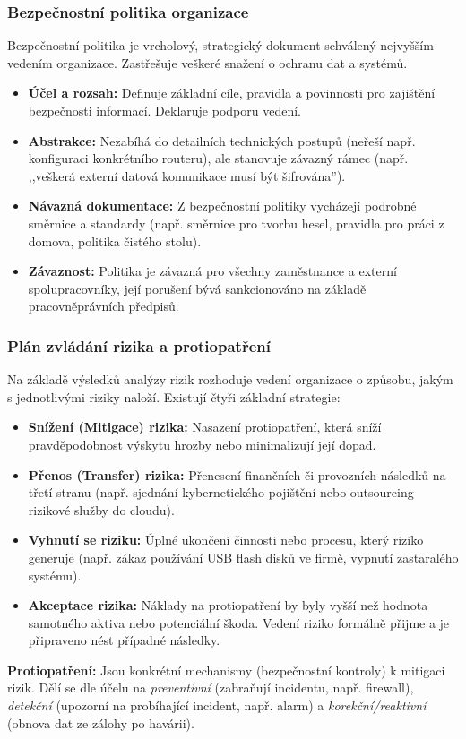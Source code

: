 \subsubsection*{Bezpečnostní politika organizace}
Bezpečnostní politika je vrcholový, strategický dokument schválený nejvyšším vedením organizace. Zastřešuje veškeré snažení o ochranu dat a systémů.
\begin{itemize}
    \item \textbf{Účel a rozsah:} Definuje základní cíle, pravidla a povinnosti pro zajištění bezpečnosti informací. Deklaruje podporu vedení.
    \item \textbf{Abstrakce:} Nezabíhá do detailních technických postupů (neřeší např. konfiguraci konkrétního routeru), ale stanovuje závazný rámec (např. ,,veškerá externí datová komunikace musí být šifrována'').
    \item \textbf{Návazná dokumentace:} Z bezpečnostní politiky vycházejí podrobné směrnice a standardy (např. směrnice pro tvorbu hesel, pravidla pro práci z domova, politika čistého stolu).
    \item \textbf{Závaznost:} Politika je závazná pro všechny zaměstnance a externí spolupracovníky, její porušení bývá sankcionováno na základě pracovněprávních předpisů.
\end{itemize}

\subsubsection*{Plán zvládání rizika a protiopatření}
Na základě výsledků analýzy rizik rozhoduje vedení organizace o způsobu, jakým s jednotlivými riziky naloží. Existují čtyři základní strategie:
\begin{itemize}
    \item \textbf{Snížení (Mitigace) rizika:} Nasazení protiopatření, která sníží pravděpodobnost výskytu hrozby nebo minimalizují její dopad.
    \item \textbf{Přenos (Transfer) rizika:} Přenesení finančních či provozních následků na třetí stranu (např. sjednání kybernetického pojištění nebo outsourcing rizikové služby do cloudu).
    \item \textbf{Vyhnutí se riziku:} Úplné ukončení činnosti nebo procesu, který riziko generuje (např. zákaz používání USB flash disků ve firmě, vypnutí zastaralého systému).
    \item \textbf{Akceptace rizika:} Náklady na protiopatření by byly vyšší než hodnota samotného aktiva nebo potenciální škoda. Vedení riziko formálně přijme a je připraveno nést případné následky.
\end{itemize}
\textbf{Protiopatření:} Jsou konkrétní mechanismy (bezpečnostní kontroly) k mitigaci rizik. Dělí se dle účelu na \textit{preventivní} (zabraňují incidentu, např. firewall), \textit{detekční} (upozorní na probíhající incident, např. alarm) a \textit{korekční/reaktivní} (obnova dat ze zálohy po havárii).

